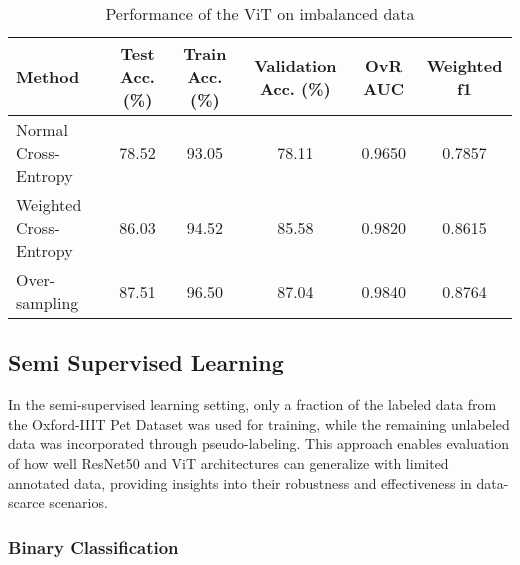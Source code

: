 \documentclass{article}
\begin{document}
\renewcommand{\arraystretch}{1.1}
\begin{table}[H] %
    \centering %
    \caption{Performance of the ViT on imbalanced data} %
    \label{tab:fully_multi_perf} %
    \begin{tabular}{|l|c|c|c|c|c|}
        \hline
        Method & Test Acc. (\%) & Train Acc. (\%) & Validation Acc. (\%) & OvR AUC & Weighted f1 \\
        \hline
        Normal Cross-Entropy & 78.52 & 93.05 & 78.11 & 0.9650 & 0.7857 \\ %
        Weighted Cross-Entropy & 86.03 & 94.52 & 85.58 & 0.9820 & 0.8615 \\ %
        Over-sampling & 87.51 & 96.50 & 87.04 & 0.9840 & 0.8764 \\ %
        \hline
    \end{tabular}
\end{table}

\subsection{Semi Supervised Learning}
In the semi-supervised learning setting, only a fraction of the labeled data from the Oxford-IIIT Pet Dataset was used for training, while the remaining unlabeled data was incorporated through pseudo-labeling. This approach enables evaluation of how well ResNet50 and ViT architectures can generalize with limited annotated data, providing insights into their robustness and effectiveness in data-scarce scenarios.

\subsubsection{Binary Classification}
\end{document}
